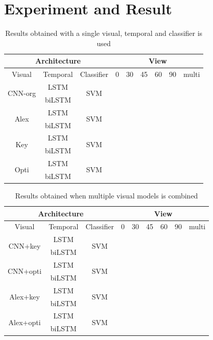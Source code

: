 \section{Experiment and Result}

\begin{table}[h]
\centering
    \begin{tabular}{ccc|cccccc}
        \multicolumn{3}{c|}{Architecture} &%
        \multicolumn{6}{c}{View}\\ \hline
        Visual  & Temporal & Classifier &%
        0& 30 & 45 & 60 & 90 & multi\\\hline
        \multirow{2}{*}{CNN-org}%
        & LSTM & \multirow{2}{*}{SVM} &%
        & & & & &\\
        & biLSTM & &%
        & & & & &\\
        \multirow{2}{*}{Alex}%
        & LSTM & \multirow{2}{*}{SVM} &%
        & & & & &\\
        & biLSTM & &%
        & & & & &\\
        \multirow{2}{*}{Key}%
        & LSTM & \multirow{2}{*}{SVM} &%
        & & & & &\\
        & biLSTM & &%
        & & & & &\\
        \multirow{2}{*}{Opti}%
        & LSTM & \multirow{2}{*}{SVM} &%
        & & & & &\\
        & biLSTM & &%
        & & & & &\\
    \end{tabular}
    \caption{Results obtained with a single visual, temporal and classifier is used}
    \label{tab:resDiffArch}
\end{table}

\begin{table}[h]
\centering
    \begin{tabular}{ccc|cccccc}
        \multicolumn{3}{c|}{Architecture} &%
        \multicolumn{6}{c}{View}\\ \hline
        Visual  & Temporal & Classifier &%
        0& 30 & 45 & 60 & 90 & multi\\\hline
        \multirow{2}{*}{CNN+key}%
        & LSTM & \multirow{2}{*}{SVM} &%
        & & & & &\\
        & biLSTM & &%
        & & & & &\\
        \multirow{2}{*}{CNN+opti}%
        & LSTM & \multirow{2}{*}{SVM} &%
        & & & & &\\
        & biLSTM & &%
        & & & & &\\
        \multirow{2}{*}{Alex+key}%
        & LSTM & \multirow{2}{*}{SVM} &%
        & & & & &\\
        & biLSTM & &%
        & & & & &\\
        \multirow{2}{*}{Alex+opti}%
        & LSTM & \multirow{2}{*}{SVM} &%
        & & & & &\\
        & biLSTM & &%
        & & & & &\\
    \end{tabular}
    \caption{Results obtained when multiple visual models is combined}
    \label{tab:resDiffArch}
\end{table}


